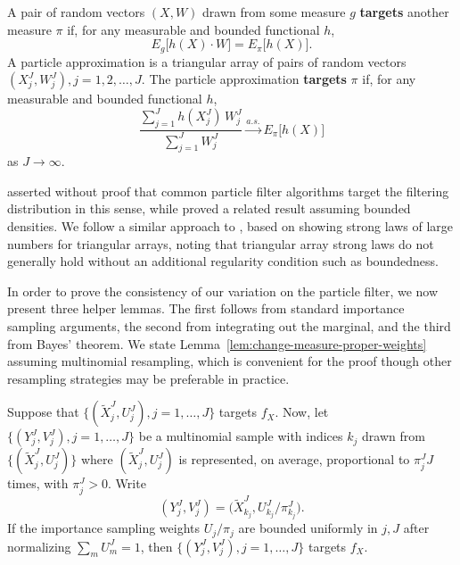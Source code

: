 \begin{defn}[Targeting]
    A pair of random vectors $(X, W)$ drawn from some measure $g$ \textbf{targets} another measure $\pi$ if, for any measurable and bounded functional $h$,
\begin{equation}
    E_g\big[h(X) \cdot W\big]=E_\pi\big[h(X)\big].
\end{equation}  
    A particle approximation is a triangular array of pairs of random vectors $(X^J_j, W^J_j), j=1,2, \ldots,J$.
    The particle approximation \textbf{targets} $\pi$ if, for any measurable and bounded functional $h$,
\begin{equation}
    \frac{\sum_{j=1}^J h(X^J_j) \, W^J_j}{\sum_{j=1}^J W^J_j} \stackrel{a.s.}{\to} E_\pi\big[h(X)\big]
\end{equation}
as $J \to \infty$.
\end{defn}
\cite{chopin04} asserted without proof that common particle filter algorithms target the filtering distribution in this sense, while \cite{chopin20} proved a related result assuming bounded densities.
We follow a similar approach to \cite{chopin20}, based on showing strong laws of large numbers for triangular arrays, noting that triangular array strong laws do not generally hold without an additional regularity condition such as boundedness.
 
In order to prove the consistency of our variation on the particle filter, we now present three helper lemmas.
The first follows from standard importance sampling arguments, the second from integrating out the marginal, and the third from Bayes' theorem. 
We state Lemma~\ref{lem:change-measure-proper-weights} assuming multinomial resampling, which is convenient for the proof though other resampling strategies may be preferable in practice.

\begin{lem}
    \label{lem:change-measure-proper-weights}
    Suppose that $\{(\tilde X_j^J,U_j^J),j=1,\dots,J\}$ targets $f_X$. Now, let $\{(Y_j^J,V_j^J),j=1,\dots,J\}$ be a multinomial sample with indices $k_j$ drawn from $\{(\tilde X_j^J,U_j^J)\}$ where $(\tilde X_j^J,U_j^J)$ is represented, on average, proportional to $\pi^J_j J$ times, with $\pi_j^J>0$. Write
    \begin{equation}
    (Y_j^J,V_j^J) = \big(\tilde X^J_{k_j},U^J_{k_j}\big/\pi^J_{k_j}\big).
    \end{equation} 
    If the importance sampling weights $U_j/\pi_j$ are bounded uniformly in $j,J$ after normalizing $\sum_m U_m^J=1$, then $\{(Y^J_j,V^J_j),j=1,\dots,J\}$ targets $f_X$.
\end{lem}

